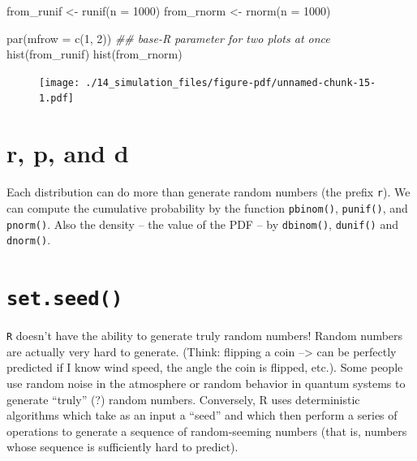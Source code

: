 \documentclass[
  letterpaper,
]{book}
\newenvironment{Shaded}{\begin{snugshade}}{\end{snugshade}}
\newcommand{\AttributeTok}[1]{\textcolor[rgb]{0.40,0.45,0.13}{#1}}
\newcommand{\DecValTok}[1]{\textcolor[rgb]{0.68,0.00,0.00}{#1}}
\newcommand{\DocumentationTok}[1]{\textcolor[rgb]{0.37,0.37,0.37}{\textit{#1}}}
\newcommand{\FunctionTok}[1]{\textcolor[rgb]{0.28,0.35,0.67}{#1}}
\newcommand{\NormalTok}[1]{\textcolor[rgb]{0.00,0.23,0.31}{#1}}
\newcommand{\OtherTok}[1]{\textcolor[rgb]{0.00,0.23,0.31}{#1}}
\theoremstyle{definition}
\theoremstyle{definition}
\theoremstyle{plain}
\theoremstyle{definition}
\theoremstyle{plain}
\theoremstyle{plain}
\theoremstyle{remark}
\begin{document}
\begin{Shaded}
\begin{Highlighting}[]
\NormalTok{from\_runif }\OtherTok{\textless{}{-}} \FunctionTok{runif}\NormalTok{(}\AttributeTok{n =} \DecValTok{1000}\NormalTok{)}
\NormalTok{from\_rnorm }\OtherTok{\textless{}{-}} \FunctionTok{rnorm}\NormalTok{(}\AttributeTok{n =} \DecValTok{1000}\NormalTok{)}

\FunctionTok{par}\NormalTok{(}\AttributeTok{mfrow =} \FunctionTok{c}\NormalTok{(}\DecValTok{1}\NormalTok{, }\DecValTok{2}\NormalTok{)) }\DocumentationTok{\#\# base{-}R parameter for two plots at once}
\FunctionTok{hist}\NormalTok{(from\_runif)}
\FunctionTok{hist}\NormalTok{(from\_rnorm)}
\end{Highlighting}
\end{Shaded}

\begin{figure}[H]

{\centering \texttt{[image: ./14\_simulation\_files/figure-pdf/unnamed-chunk-15-1.pdf]}

}

\end{figure}

\hypertarget{r-p-and-d}{%
\section{r, p, and d}\label{r-p-and-d}}

Each distribution can do more than generate random numbers (the prefix
\texttt{r}). We can compute the cumulative probability by the function
\texttt{pbinom()}, \texttt{punif()}, and \texttt{pnorm()}. Also the
density -- the value of the PDF -- by \texttt{dbinom()},
\texttt{dunif()} and \texttt{dnorm()}.

\hypertarget{set.seed}{%
\section{\texorpdfstring{\texttt{set.seed()}}{set.seed()}}\label{set.seed}}

\texttt{R} doesn't have the ability to generate truly random numbers!
Random numbers are actually very hard to generate. (Think: flipping a
coin --\textgreater{} can be perfectly predicted if I know wind speed,
the angle the coin is flipped, etc.). Some people use random noise in
the atmosphere or random behavior in quantum systems to generate
``truly'' (?) random numbers. Conversely, R uses deterministic
algorithms which take as an input a ``seed'' and which then perform a
series of operations to generate a sequence of random-seeming numbers
(that is, numbers whose sequence is sufficiently hard to predict).
\end{document}

